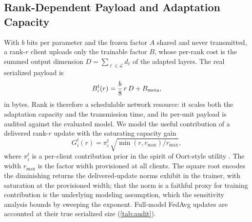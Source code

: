 \documentclass[a4paper,fleqn]{cas-dc}
\begin{document}
\subsection{Rank-Dependent Payload and Adaptation Capacity}
With $b$ bits per parameter and the frozen factor $A$ shared and never transmitted, a rank-$r$ client uploads only the trainable factor $B$, whose per-rank cost is the summed output dimension $D=\sum_{\ell\in\mathcal L}d_\ell$ of the adapted layers. The real serialized payload is
\begin{equation}
B_i^t(r)=\frac{b}{8}\,r\,D+B_{\rm meta},
\label{eq:size}
\end{equation}
in bytes. Rank is therefore a schedulable network resource: it scales both the adaptation capacity and the transmission time, and its per-unit payload is audited against the evaluated model. We model the useful contribution of a delivered rank-$r$ update with the saturating capacity gain
\begin{equation}
G_i^t(r)=\pi_i^t\,\sqrt{\min(r,r_{\max})/r_{\max}},
\label{eq:cap}
\end{equation}
where $\pi_i^t$ is a per-client contribution prior in the spirit of Oort-style utility \cite{oort2021oort}. The width $r_{\max}$ is the factor width provisioned at all clients. The square root encodes the diminishing returns the delivered-update norms exhibit in the trainer, with saturation at the provisioned width; that the norm is a faithful proxy for training contribution is the underlying modeling assumption, which the sensitivity analysis bounds by sweeping the exponent. Full-model FedAvg updates \cite{mcmahan2017fedavg} are accounted at their true serialized size (\cref{tab:audit}).
\end{document}
